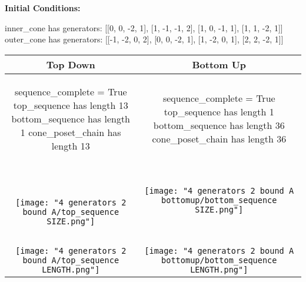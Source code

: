 \documentclass[10pt]{article}
\begin{document}
\textbf{Initial Conditions:}
\begin{SAGE}
inner_cone has generators: 
[[0, 0, -2, 1], [1, -1, -1, 2], [1, 0, -1, 1], [1, 1, -2, 1]]
outer_cone has generators: 
[[-1, -2, 0, 2], [0, 0, -2, 1], [1, -2, 0, 1], [2, 2, -2, 1]]

\end{SAGE}
\begin{tabular}{c|c}
\textbf{Top Down} & \textbf{Bottom Up} \\ \hline  
\begin{SAGE}
	sequence_complete = True
	top_sequence has length 13
	bottom_sequence has length 1
	cone_poset_chain has length 13
\end{SAGE} 
&
\begin{SAGE}	sequence_complete = True
	top_sequence has length 1
	bottom_sequence has length 36
	cone_poset_chain has length 36
\end{SAGE} 
\\ \hline
\
\begin{minipage}{.45\textwidth}
\texttt{[image: "4 generators 2 bound A/top\_sequence SIZE.png"]}
\end{minipage} &
\begin{minipage}{.45\textwidth}
\texttt{[image: "4 generators 2 bound A bottomup/bottom\_sequence SIZE.png"]}
\end{minipage} \\ \\
\hline \\\begin{minipage}{.45\textwidth}
\texttt{[image: "4 generators 2 bound A/top\_sequence LENGTH.png"]}
\end{minipage} &
\begin{minipage}{.45\textwidth}
\texttt{[image: "4 generators 2 bound A bottomup/bottom\_sequence LENGTH.png"]}
\end{minipage}
\end{tabular}
\end{document}
